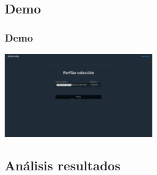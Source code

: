\documentclass{beamer}
\begin{document}
\subsection{Demo}
\begin{frame}
\frametitle{Demo}

\begin{center}
	\href{run://usr/bin/vlc final.mp4}{
		\includegraphics[width=0.5\textwidth]
		{final.png}}
\end{center}
	
\end{frame}
\subsection{Análisis resultados}
\end{document}
